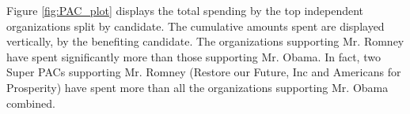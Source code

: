 \documentclass[11pt]{article}\usepackage{graphicx, color}
\begin{document}
% 
% 

Figure \ref{fig:PAC_plot} displays the total spending by the top independent organizations split by candidate. The cumulative amounts spent are displayed vertically, by the benefiting candidate. The organizations supporting Mr. Romney have spent significantly more than those supporting Mr. Obama. In fact, two Super PACs supporting Mr. Romney (Restore our Future, Inc and Americans for Prosperity) have spent more than all the organizations supporting Mr. Obama combined.
\end{document}
